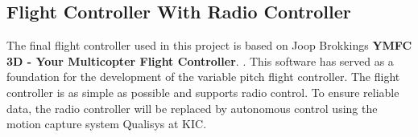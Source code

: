 \subsection{Flight Controller With Radio Controller}

The final flight controller used in this project is based on Joop Brokkings \textbf{YMFC 3D - Your Multicopter Flight Controller}. \cite{joop}. This software has served as a foundation for the development of the variable pitch flight controller. The flight controller is as simple as possible and supports radio control. To ensure reliable data, the radio controller will be replaced by autonomous control using the motion capture system Qualisys at KIC.

